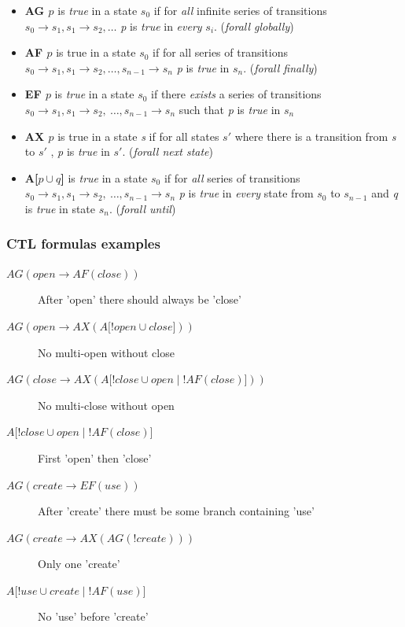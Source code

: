 \begin{itemize}
 \item \textbf{AG $p$} is \emph{true} in a state $s_{0}$ if for \emph{all} infinite series of transitions $s_{0} \rightarrow s_{1} , s_{1} \rightarrow 
  s_{2} , \ldots$ \emph{p} is \emph{true} in \emph{every} $s_{i}$. (\emph{forall globally})
 
 \item \textbf{AF $p$} is true in a state $s_{0}$ if for all series of transitions $s_{0} \rightarrow s_{1}, s_{1} \rightarrow
  s_{2},\ldots, s_{n-1} \rightarrow s_{n}$ \emph{p} is \emph{true} in $s_{n}$. (\emph{forall finally})

 \item \textbf{EF $p$} is \emph{true} in a state $s_{0}$ if there \emph{exists} a series of transitions $s_{0} \rightarrow s_{1}, 
 s_{1} \rightarrow s_{2},~\ldots, s_{n-1} \rightarrow s_{n}$ such that \emph{p} is \emph{true} in $s_{n}$
  
\item \textbf{AX $p$} is true in a state \emph{s} if for all states $s'$ where there is a transition from \emph{s} to
  $s'$ , \emph{p} is \emph{true} in $s'$. (\emph{forall next state})
  \item \textbf{A[$p \cup q$]} is \emph{true} in a state $s_{0}$ if for \emph{all} series of transitions $s_{0} \rightarrow s_{1},
  s_{1} \rightarrow s_{2},~\ldots, s_{n-1} \rightarrow s_{n}$ \emph{p} is \emph{true} in \emph{every} state from $s_{0}$ to
  $s_{n-1}$ and \emph{q} is \emph{true} in state $s_{n}$. (\emph{forall until})
\end{itemize}

\subsubsection{CTL formulas examples}
\begin{description}
 \item[$AG(open \rightarrow AF(close))$] After 'open' there should always be 'close'
 \item[$AG(open \rightarrow AX(A\lbrack!open \cup close\rbrack))$] No multi-open without close
 \item[$AG(close \rightarrow AX(A\lbrack!close \cup open \mid !AF(close) \rbrack))$] No multi-close without open
 \item[$A\lbrack !close \cup open \mid !AF(close)\rbrack$] First 'open' then 'close'
 \item[$AG( create \rightarrow EF(use) )$] After 'create' there must be some branch containing 'use'
 \item[$AG( create \rightarrow AX(AG(!create)) )$] Only one 'create'
 \item[$A\lbrack !use \cup create \mid !AF(use)\rbrack$] No 'use' before 'create'
\end{description}